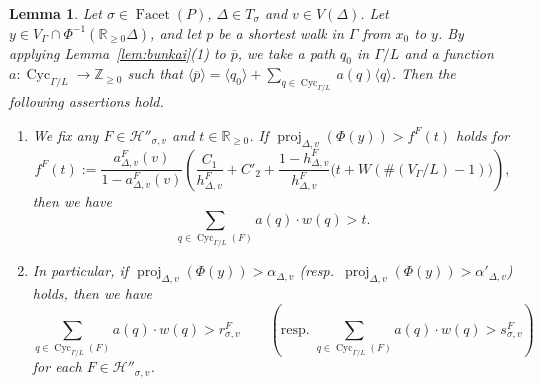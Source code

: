 \documentclass[11pt]{article}
\newtheorem{lem}[theo]{Lemma}
\theoremstyle{definition}
\numberwithin{equation}{section}
\begin{document}
\begin{lem}\label{lem:rs}
Let $\sigma \in \operatorname{Facet}(P)$, $\Delta \in T_{\sigma}$ and $v \in V(\Delta)$. 
Let $y \in V_{\Gamma} \cap \Phi^{-1} (\mathbb{R}_{\ge 0} \Delta)$, 
and let $p$ be a shortest walk in $\Gamma$ from $x_0$ to $y$. 
By applying Lemma~\ref{lem:bunkai}(1) to $\overline{p}$, 
we take a path $q_0$ in $\Gamma /L$ and a function $a : \operatorname{Cyc}_{\Gamma /L} \to \mathbb{Z}_{\ge 0}$ 
such that $\langle \overline{p} \rangle = \langle q_0 \rangle + \sum _{q \in \operatorname{Cyc}_{\Gamma /L}} a(q) \langle q \rangle$. 
Then the following assertions hold. 

\begin{enumerate}
\item
We fix any $F \in \mathcal{H}'' _{\sigma, v}$ and $t \in \mathbb{R}_{\ge 0}$. 
If $\operatorname{proj}_{\Delta, v} (\Phi(y)) > f^F(t)$ holds for
\[
f^F(t) := \frac{a^{F} _{\Delta, v} (v)}{1-a^{F} _{\Delta, v} (v)}
\left( \frac{C_1}{h^F_{\Delta, v}} + C'_2 + \frac{1-h^F_{\Delta, v}}{h^F_{\Delta, v}} \bigl( t + W ( \#(V_{\Gamma}/L) -1) \bigr) \right), 
\]
then we have
\[
\sum _{q \in \operatorname{Cyc}_{\Gamma /L}(F)} a(q) \cdot w(q) > t. 
\]

\item
In particular, if $\operatorname{proj}_{\Delta, v} (\Phi(y)) > \alpha _{\Delta, v}$ (resp.\ $\operatorname{proj}_{\Delta, v} (\Phi(y)) > \alpha' _{\Delta, v}$) holds, then we have 
\[
\sum _{q \in \operatorname{Cyc}_{\Gamma /L}(F)} a(q) \cdot w(q) > r^{F} _{\sigma, v} \qquad
(\text{resp.\ $\sum _{q \in \operatorname{Cyc}_{\Gamma /L}(F)} a(q) \cdot w(q) > s^{F} _{\sigma, v}$})
\]
for each $F \in \mathcal{H}'' _{\sigma, v}$. 
\end{enumerate}
\end{lem}
\end{document}
